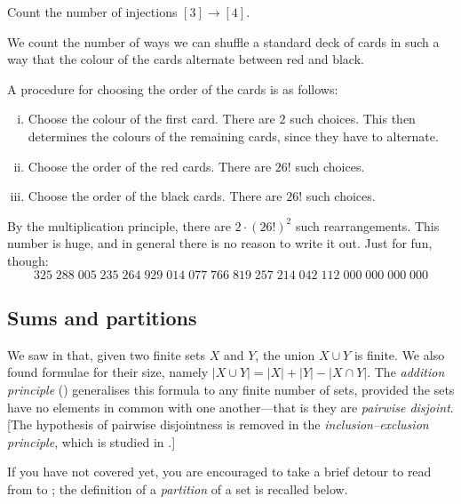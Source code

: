 \begin{exercise}
Count the number of injections $[3] \to [4]$.
\end{exercise}

\begin{example}
We count the number of ways we can shuffle a standard deck of cards in such a way that the colour of the cards alternate between red and black.

A procedure for choosing the order of the cards is as follows:
\begin{enumerate}[(i)]
\item Choose the colour of the first card. There are $2$ such choices. This then determines the colours of the remaining cards, since they have to alternate.
\item Choose the order of the red cards. There are $26!$ such choices.
\item Choose the order of the black cards. There are $26!$ such choices.
\end{enumerate}
By the multiplication principle, there are $2 \cdot (26!)^2$ such rearrangements. This number is huge, and in general there is no reason to write it out. Just for fun, though:
\[325\;288\;005\;235\;264\;929\;014\;077\;766\;819\;257\;214\;042\;112\;000\;000\;000\;000\]
\end{example}

\subsection*{Sums and partitions}

We saw in  that, given two finite sets $X$ and $Y$, the union $X \cup Y$ is finite. We also found formulae for their size, namely $|X \cup Y| = |X| + |Y| - |X \cap Y|$. The \textit{addition principle} () generalises this formula to any finite number of sets, provided the sets have no elements in common with one another---that is they are \textit{pairwise disjoint}. [The hypothesis of pairwise disjointness is removed in the \textit{inclusion--exclusion principle}, which is studied in .]

If you have not covered  yet, you are encouraged to take a brief detour to read from  to ; the definition of a \textit{partition} of a set is recalled below.

